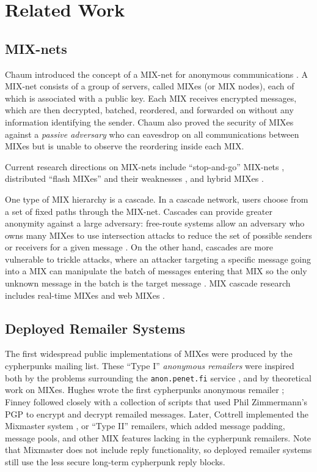 \documentclass{llncs}
\begin{document}

\section{Related Work}

\subsection{MIX-nets}

Chaum introduced the concept of a MIX-net for anonymous communications
\cite{chaum-mix}. A MIX-net consists of a group of servers, called
MIXes (or MIX nodes), each of which is associated with a public
key. Each MIX receives encrypted messages, which are then decrypted,
batched, reordered, and forwarded on without any information
identifying the sender. Chaum also proved the security of MIXes
against a \emph{passive adversary} who can eavesdrop on all
communications between MIXes but is unable to observe the reordering
inside each MIX.

Current research directions on MIX-nets include ``stop-and-go'' MIX-nets
\cite{kesdogan}, distributed ``flash MIXes'' \cite{flash-mix} and their
weaknesses \cite{desmedt,mitkuro}, and hybrid MIXes \cite{hybrid-mix}.

One type of MIX hierarchy is a cascade.
In a cascade network, users choose from a set of fixed paths through
the MIX-net.
Cascades can provide greater anonymity against a large adversary:
free-route systems allow an adversary who owns many MIXes to use
intersection attacks to reduce the set of possible senders or receivers
for a given
message \cite{disad-free-routes}. On the other hand, cascades are more
vulnerable \cite{batching-taxonomy} to trickle attacks, where an attacker
targeting a specific message going into a MIX can manipulate the batch
of messages entering that MIX so the only unknown message in the batch
is the target message \cite{mixmaster-attacks,babel}.
MIX cascade research includes real-time MIXes \cite{realtime-mix} and
web MIXes \cite{web-mix}.

\subsection{Deployed Remailer Systems}

The first widespread public implementations of MIXes were produced by the
cypherpunks mailing list. These ``Type I'' \emph{anonymous remailers}
were inspired both by the problems surrounding the {\tt anon.penet.fi}
service \cite{helsingius}, and by theoretical work on MIXes. Hughes wrote
the first cypherpunks anonymous remailer \cite{remailer-history}; Finney
followed closely with a collection of scripts that used Phil Zimmermann's
PGP to encrypt and decrypt remailed messages. Later, Cottrell implemented
the Mixmaster system \cite{mixmaster}, or ``Type II'' remailers, which
added message padding, message pools, and other MIX features lacking
in the cypherpunk remailers. Note that Mixmaster does not include reply
functionality, so deployed remailer systems still use the less secure
long-term cypherpunk reply blocks.
\end{document}
